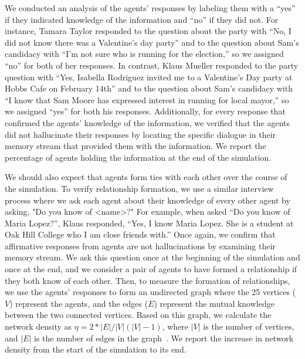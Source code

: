 We conducted an analysis of the agents' responses by labeling them with a ``yes'' if they indicated knowledge of the information and ``no'' if they did not. For instance, Tamara Taylor responded to the question about the party with {\color{darkgray}\small\fontfamily{}\selectfont
``No, I did not know there was a Valentine's day party''} and to the question about Sam's candidacy with {\color{darkgray}\small\fontfamily{}\selectfont
``I'm not sure who is running for the election,''} so we assigned ``no'' for both of her responses. In contrast, Klaus Mueller responded to the party question with {\color{darkgray}\small\fontfamily{}\selectfont
``Yes, Isabella Rodriguez invited me to a Valentine's Day party at Hobbs Cafe on February 14th''} and to the question about Sam's candidacy with {\color{darkgray}\small\fontfamily{}\selectfont
``I know that Sam Moore has expressed interest in running for local mayor,''} so we assigned ``yes'' for both his responses. Additionally, for every response that confirmed the agents' knowledge of the information, we verified that the agents did not hallucinate their responses by locating the specific dialogue in their memory stream that provided them with the information. We report the percentage of agents holding the information at the end of the simulation.

We should also expect that agents form ties with each other over the course of the simulation. To verify relationship formation, we use a similar interview process where we ask each agent about their knowledge of every other agent by asking, "Do you know of <name>?" For example, when asked ``Do you know of Maria Lopez?'', Klaus responded, {\color{darkgray}\small\fontfamily{}\selectfont
``Yes, I know Maria Lopez. She is a student at Oak Hill College who I am close friends with.''} Once again, we confirm that affirmative responses from agents are not hallucinations by examining their memory stream. We ask this question once at the beginning of the simulation and once at the end, and we consider a pair of agents to have formed a relationship if they both know of each other. Then, to measure the formation of relationships, we use the agents' responses to form an undirected graph where the 25 vertices ($V$) represent the agents, and the edges ($E$) represent the mutual knowledge between the two connected vertices. Based on this graph, we calculate the network density as $\eta = 2 * |E| / |V| (|V| - 1)$, where $|V|$ is the number of vertices, and $|E|$ is the number of edges in the graph~\cite{77_Ackland2013How}. We report the increase in network density from the start of the simulation to its end.

